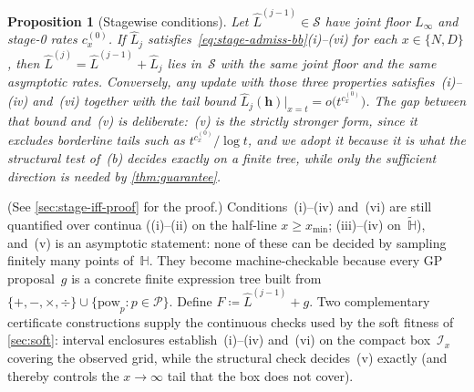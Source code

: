 \documentclass[11pt]{article}
\newcommand{\calS}{\mathcal{S}}
\newcommand{\calI}{\mathcal{I}}
\newcommand{\calP}{\mathcal{P}}
\newcommand{\bbH}{\mathbb{H}}
\newcommand{\Lhat}{\hat{L}}
\theoremstyle{plain}
\newtheorem{proposition}{Proposition}
\theoremstyle{remark}
\begin{document}
\begin{proposition}[Stagewise conditions]\label{prop:stage-iff}
Let $\Lhat^{(j-1)} \in \calS$ have joint floor $L_\infty$ and stage-0 rates $c_x^{(0)}$.
If $\Lhat_j$ satisfies~\eqref{eq:stage-admiss-bb}(i)--(vi) for each $x \in \{N,D\}$, then
$\Lhat^{(j)} = \Lhat^{(j-1)} + \Lhat_j$ lies in~$\calS$ with the same joint floor
and the same asymptotic rates.
Conversely, any update with those three properties satisfies~(i)--(iv) and~(vi)
together with the tail bound
$\Lhat_j(\mathbf{h})|_{x=t} = o\bigl(t^{c_x^{(0)}}\bigr)$.
The gap between that bound and~(v) is deliberate:~(v) is the strictly stronger
form, since it excludes borderline tails such as $t^{c_x^{(0)}}/\log t$, and we adopt
it because it is what the structural test of~(b) decides exactly on a finite
tree, while only the sufficient direction is needed by \cref{thm:guarantee}.
\end{proposition}
(See \cref{sec:stage-iff-proof} for the proof.)
Conditions~(i)--(iv) and~(vi) are still quantified over continua ((i)--(ii) on the half-line $x\geq x_{\min}$; (iii)--(iv) on~$\widetilde{\bbH}$), and~(v) is an asymptotic statement: none of these can be decided by sampling finitely many points of~$\bbH$.
They become machine-checkable because every GP proposal~$g$ is a concrete finite expression tree built from~$\{+,-,\times,\div\}\cup\{\mathrm{pow}_p:p\in\calP\}$. Define $F \coloneqq \Lhat^{(j-1)} + g$. Two complementary certificate constructions supply the continuous checks used by the soft fitness of \cref{sec:soft}: interval enclosures establish~(i)--(iv) and~(vi) on the compact box~$\calI_x$ covering the observed grid, while the structural check decides~(v) exactly (and thereby controls the $x\to\infty$ tail that the box does not cover).
\end{document}
